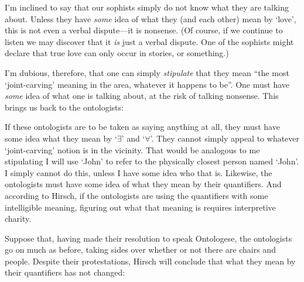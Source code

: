 \documentclass[11pt]{article}
\begin{document}
\begin{spacing}{1.25}



I'm inclined to say that our sophists simply do not know what they are
talking about.  Unless they have {\em some} idea of what they (and
each other) mean by `love', this is not even a verbal dispute---it is
nonsense.  (Of course, if we continue to listen we may discover that
it {\em is} just a verbal dispute.  One of the sophists might declare that
true love can only occur in stories, or something.)

I'm dubious, therefore, that one can simply {\em stipulate} that they
mean ``the most `joint-carving' meaning in the area, whatever it
happens to be''.  One must have {\em some} idea of what one is talking
about, at the risk of talking nonsense.  This brings us back to the
ontologists:





If these ontologists are to be taken as saying anything at all, they
must have some idea what they mean by `$\exists$' and `$\forall$'.
They cannot simply appeal to whatever `joint-carving' notion is in the
vicinity.  That would be analogous to me stipulating I will use `John'
to refer to the physically closest person named `John'.  I simply
cannot do this, unless I have some idea who that is.  Likewise, the
ontologists must have some idea of what they mean by their
quantifiers.  And according to Hirsch, if the ontologists are using
the quantifiers with some intelligible meaning, figuring out what that
meaning is requires interpretive charity.

Suppose that, having made their resolution to speak Ontologese, the
ontologists go on much as before, taking sides over whether or not
there are chairs and people.  Despite their protestations, Hirsch will
conclude that what they mean by their quantifiers has not changed:


\end{spacing}
\end{document}
